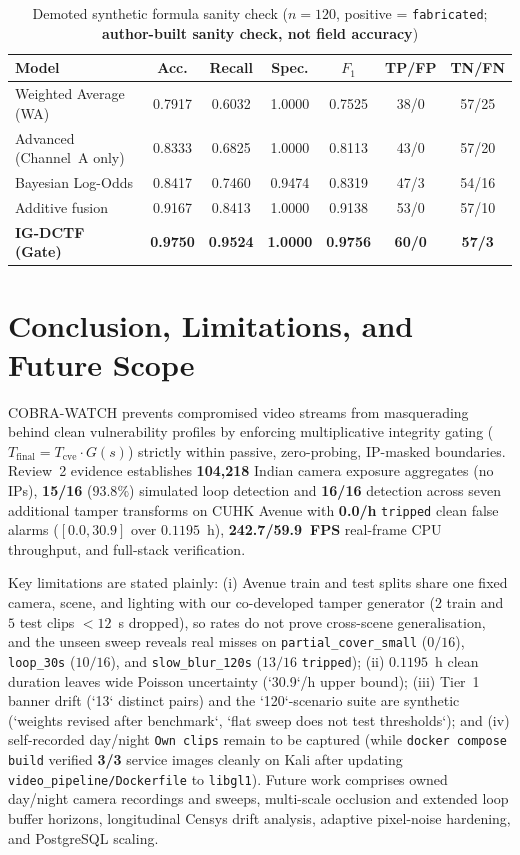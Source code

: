 \documentclass[12pt,a4paper]{article}
\begin{document}
\begin{table}[!ht]
  \centering
  \caption{Demoted synthetic formula sanity check ($n = 120$, positive = \texttt{fabricated}; \textbf{author-built sanity check, not field accuracy})}
  \label{tab:syn}
  \begin{tabular}{@{}lcccccc@{}}
    \toprule
    \textbf{Model} & \textbf{Acc.} & \textbf{Recall} & \textbf{Spec.} & \textbf{$F_1$} & \textbf{TP/FP} & \textbf{TN/FN} \\
    \midrule
    Weighted Average (WA) & 0.7917 & 0.6032 & 1.0000 & 0.7525 & 38/0 & 57/25 \\
    Advanced (Channel~A only) & 0.8333 & 0.6825 & 1.0000 & 0.8113 & 43/0 & 57/20 \\
    Bayesian Log-Odds & 0.8417 & 0.7460 & 0.9474 & 0.8319 & 47/3 & 54/16 \\
    Additive fusion & 0.9167 & 0.8413 & 1.0000 & 0.9138 & 53/0 & 57/10 \\
    \textbf{IG-DCTF (Gate)} & \textbf{0.9750} & \textbf{0.9524} & \textbf{1.0000} & \textbf{0.9756} & \textbf{60/0} & \textbf{57/3} \\
    \bottomrule
  \end{tabular}
\end{table}

\section{Conclusion, Limitations, and Future Scope}
COBRA-WATCH prevents compromised video streams from masquerading behind clean vulnerability profiles by enforcing multiplicative integrity gating ($T_{\mathrm{final}} = T_{\mathrm{cve}} \cdot G(s)$) strictly within passive, zero-probing, IP-masked boundaries. Review~2 evidence establishes \textbf{104,218} Indian camera exposure aggregates (no IPs), \textbf{15/16} ($93.8\%$) simulated loop detection and \textbf{16/16} detection across seven additional tamper transforms on CUHK Avenue with \textbf{0.0/h} \texttt{tripped} clean false alarms ($[0.0, 30.9]$ over $0.1195$~h), \textbf{242.7/59.9~FPS} real-frame CPU throughput, and full-stack verification.

Key limitations are stated plainly: (i) Avenue train and test splits share one fixed camera, scene, and lighting with our co-developed tamper generator ($2$ train and $5$ test clips $< 12$~s dropped), so rates do not prove cross-scene generalisation, and the unseen sweep reveals real misses on \texttt{partial\_cover\_small} ($0/16$), \texttt{loop\_30s} ($10/16$), and \texttt{slow\_blur\_120s} ($13/16$ \texttt{tripped}); (ii) $0.1195$~h clean duration leaves wide Poisson uncertainty (`30.9`/h upper bound); (iii) Tier~1 banner drift (`13` distinct pairs) and the `120`-scenario suite are synthetic (`weights revised after benchmark`, `flat sweep does not test thresholds`); and (iv) self-recorded day/night \texttt{Own clips} remain to be captured (while \texttt{docker compose build} verified \textbf{3/3} service images cleanly on Kali after updating \texttt{video\_pipeline/Dockerfile} to \texttt{libgl1}). Future work comprises owned day/night camera recordings and sweeps, multi-scale occlusion and extended loop buffer horizons, longitudinal Censys drift analysis, adaptive pixel-noise hardening, and PostgreSQL scaling.
\end{document}
